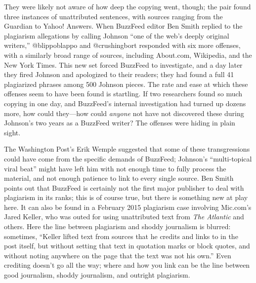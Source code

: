 They were likely not aware of how deep the copying went, though; the pair found three instances of unattributed sentences, with sources ranging from the Guardian to Yahoo! Answers.\autocite{blippoblappo_3_2014} When BuzzFeed editor Ben Smith replied to the plagiarism allegations by calling Johnson ``one of the web's deeply original writers,'' @blippoblappo and @crushingbort responded with six more offenses, with a similarly broad range of sources, including About.com, Wikipedia, and the New York Times.\autocite{blippoblappo_more_2014} This new set forced BuzzFeed to investigate, and a day later they fired Johnson and apologized to their readers; they had found a full 41 plagiarized phrases among 500 Johnson pieces.\autocite{smith_editors_2014} The rate and ease at which these offenses seem to have been found is startling. If two researchers found so much copying in one day, and BuzzFeed's internal investigation had turned up dozens more, how could they---how could \emph{anyone} not have not discovered these during Johnson's two years as a BuzzFeed writer? The offenses were hiding in plain sight.

The Washington Post's Erik Wemple suggested that some of these transgressions could have come from the specific demands of BuzzFeed; Johnson's ``multi-topical viral beat'' might have left him with not enough time to fully process the material, and not enough patience to link to every single source.\autocite{wemple_ravages_2014} Ben Smith points out that BuzzFeed is certainly not the first major publisher to deal with plagiarism in its ranks; this is of course true, but there is something new at play here. It can also be found in a February 2015 plagiarism case involving Mic.com's Jared Keller, who was outed for using unattributed text from \emph{The Atlantic} and others. Here the line between plagiarism and shoddy journalism is blurred: sometimes, ``Keller lifted text from sources that he credits and links to in the post itself, but without setting that text in quotation marks or block quotes, and without noting anywhere on the page that the text was not his own.''\autocite{trotter_plagiarist_2015} Even crediting doesn't go all the way; where and how you link can be the line between good journalism, shoddy journalism, and outright plagiarism.

